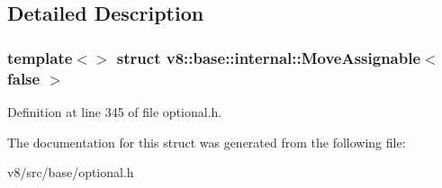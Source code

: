 \subsection{Detailed Description}
\subsubsection*{template$<$$>$\newline
struct v8\+::base\+::internal\+::\+Move\+Assignable$<$ false $>$}



Definition at line 345 of file optional.\+h.



The documentation for this struct was generated from the following file\+:\begin{DoxyCompactItemize}
\item 
v8/src/base/optional.\+h\end{DoxyCompactItemize}
